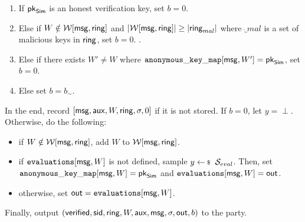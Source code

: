 \begin{tcolorbox}[left=2pt,right=2pt]
\begin{list}{\hspace*{1pt} C}{\setlength\leftmargin{0.15in}}
			\begin{enumerate}
				\item If   $ \mathsf{pk}_{\mathsf{Sim}} $ is an honest verification key, set $ b = 0 $. 
				\label{cond-main:forgery}
				
				\item Else if $ W \notin \mathcal{W}[\mathsf{msg},\mathsf{ring}] $ and $ |\mathcal{W}[\mathsf{msg}, \mathsf{ring}]| \geq |\mathsf{ring}_{mal}| $ where $ \ring_{mal} $ is a set of malicious keys in $ \mathsf{ring} $, set $ b = 0 $.
				\label{cond-main:uniqueness}.
				
				\item Else if there exists $ W' \neq W $ where  $ \mathtt{anonymous\_key\_map}[\mathsf{msg},W'] = \mathsf{pk}_{\mathsf{Sim}} $, set $ b = 0 $. \label{cond-main:differentWforsamepk} 
				\item Else set $ b = b_\sim$. \label{cond-main:simulatorbit}
			\end{enumerate}		
			
		\end{list}
		In the end,  record $ [\mathsf{msg},\mathsf{aux},W,\mathsf{ring},\sigma, 0] $ if it is not stored. If $ b = 0 $, let $y = \perp $. Otherwise,   do the following:
		\begin{itemize}
			\item if $ W \notin \mathcal{W}[\mathsf{msg},\mathsf{ring}] $, add $ W $ to $ \mathcal{W}[\mathsf{msg},\mathsf{ring}]  $.
			\item if $ \texttt{evaluations}[\mathsf{msg},W] $ is not defined, sample $ y \leftsample \setsym{S}_{eval}$. Then, set $ \mathtt{anonymous\_key\_map}[\mathsf{msg},W]  = \mathsf{pk}_{\mathsf{Sim}}$ and $ \texttt{evaluations}[\mathsf{msg}, W] = {\mathsf{out}}$.
			\item otherwise, set $ {\mathsf{out}} = \texttt{evaluations}[\mathsf{msg}, W]$. 	
		\end{itemize}
		Finally, output $(\mathsf{verified}, \textsf{sid}, \mathsf{ring},W, \mathsf{aux},\mathsf{msg}, \sigma, {\mathsf{out}}, b)$ to the party.
		

\end{tcolorbox}
